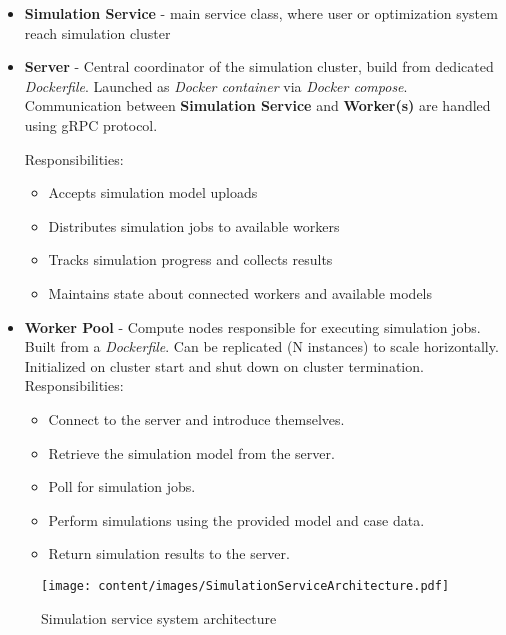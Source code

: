 \begin{itemize}
	\item \textbf{Simulation Service} - main service class, where user or optimization system reach simulation cluster
	
	\item \textbf{Server} - Central coordinator of the simulation cluster, build from dedicated \textit{Dockerfile}. Launched as \textit{Docker container} via \textit{Docker compose}. Communication between \textbf{Simulation Service} and \textbf{Worker(s)} are handled using gRPC protocol.
	
	Responsibilities:
	\begin{itemize}
		\item Accepts simulation model uploads
		\item Distributes simulation jobs to available workers
		\item Tracks simulation progress and collects results
		\item Maintains state about connected workers and available models
	\end{itemize}

	\item \textbf{Worker Pool} - Compute nodes responsible for executing simulation jobs. Built from a \textit{Dockerfile}. Can be replicated (N instances) to scale horizontally. Initialized on cluster start and shut down on cluster termination.
		Responsibilities:
	\begin{itemize}
		\item Connect to the server and introduce themselves.
		\item Retrieve the simulation model from the server.
		\item Poll for simulation jobs.
		\item Perform simulations using the provided model and case data.
		\item Return simulation results to the server.
	\end{itemize}
	
\end{itemize}

\begin{figure}[H]
	\centering
	\texttt{[image: content/images/SimulationServiceArchitecture.pdf]} 
	\caption{Simulation service system architecture}
	\label{fig:SimulationServiceSystemArchitecture}
\end{figure}

